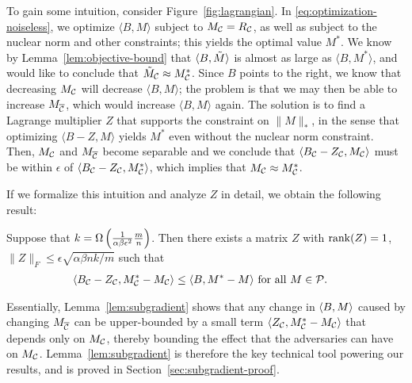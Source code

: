 To gain some intuition, consider 
Figure~\ref{fig:lagrangian}. In \eqref{eq:optimization-noiseless}, we optimize 
$\langle B, M \rangle$ subject to $M_{\mathcal{C}} = R_{\mathcal{C}}$, as well as subject to 
the nuclear norm and other constraints; this yields the optimal value $M^*$. 
We know by Lemma~\ref{lem:objective-bound} that $\langle B, \tilde{M} \rangle$ is almost 
as large as $\langle B, M^* \rangle$, and would like to conclude that 
$\tilde{M}_{\mathcal{C}} \approx M^*_{\mathcal{C}}$. Since $B$ points to the right, we know that 
decreasing $M_{\mathcal{C}}$ will decrease $\langle B, M \rangle$; the problem is that 
we may then be able to increase $M_{\overline{\mathcal{C}}}$, which would increase 
$\langle B, M \rangle$ again. The solution is to find a Lagrange 
multiplier $Z$ that supports 
the constraint on $\|M\|_*$, in the sense that optimizing 
$\langle B-Z, M \rangle$ yields $M^*$ even without the nuclear norm constraint. 
Then, $M_{\mathcal{C}}$ and $M_{\overline{\mathcal{C}}}$ become separable and we conclude that 
$\langle B_{\mathcal{C}} - Z_{\mathcal{C}}, M_{\mathcal{C}} \rangle$ must be within $\epsilon$ of 
$\langle B_{\mathcal{C}} - Z_{\mathcal{C}}, M^*_{\mathcal{C}} \rangle$, which implies that 
$M_{\mathcal{C}} \approx M^*_{\mathcal{C}}$.

If we formalize this intuition and analyze $Z$ in detail, we obtain the 
following result:
\begin{lemma}
\label{lem:subgradient}
Suppose that $k = \Omega\left( \frac{1}{\alpha\beta\epsilon^2}\frac{m}{n} \right)$. 
Then there exists a matrix $Z$ with 
$\operatorname{rank}(Z) = 1$, $\|Z\|_F \leq \epsilon \sqrt{\alpha\beta nk/m}$ such that
\begin{align}
\langle B_{\mathcal{C}} - Z_{\mathcal{C}}, M^*_{\mathcal{C}} - M_{\mathcal{C}} \rangle &\leq \langle B, M^* - M \rangle \text{ for all $M \in \mathcal{P}$}.
\end{align}
\end{lemma}
Essentially, Lemma~\ref{lem:subgradient} shows that any change in 
$\langle B, M \rangle$ caused by changing $M_{\overline{\mathcal{C}}}$ can be upper-bounded 
by a small term $\langle Z_{\mathcal{C}}, M^*_{\mathcal{C}} - M_{\mathcal{C}} \rangle$ that depends only 
on $M_{\mathcal{C}}$, thereby bounding the effect that the adversaries can have 
on $M_{\mathcal{C}}$. Lemma~\ref{lem:subgradient} is therefore the key 
technical tool powering our results, and is proved in 
Section~\ref{sec:subgradient-proof}.

